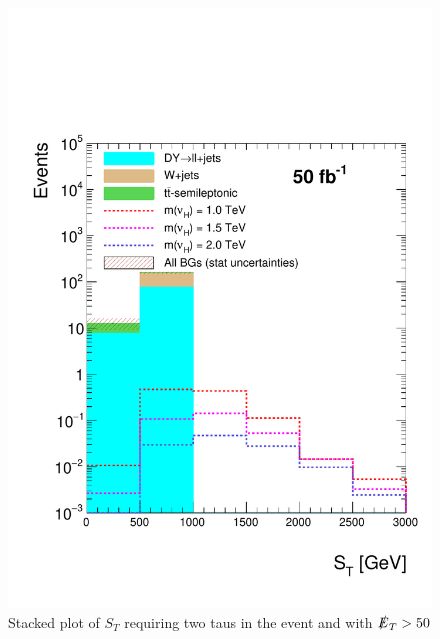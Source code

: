 \begin{figure}[H]
\centering
\includegraphics[width=\linewidth]{StackPlots/ST_2taus_met50_50ifb.pdf}
\caption{Stacked plot of $S_{T}$ requiring two taus in the event and with $\slashed{E}_{T} > 50$}
\label{fig: ST2tausMet50}
\end{figure}


